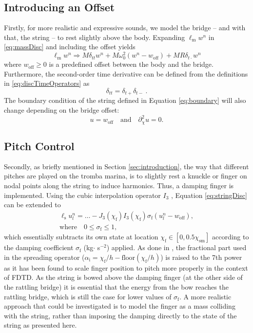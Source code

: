 \documentclass[dvipsnames, pdftex]{article}
\def\stringx{\chi}
\def\us{u}
\def\um{w}
\begin{document}
\subsection{Introducing an Offset}
Firstly, for more realistic and expressive sounds, we model the bridge -- and with that, the string -- to rest slightly above the body. Expanding $\ell_\text{m}\um^n$ in \eqref{eq:massDisc} and including the offset yields
\begin{equation}\label{eq:offset}
    \ell_\text{m}\um^n \Rightarrow M\delta_{tt}\um^n+M\omega_0^2(\um^n-\um_\text{off})+MR\delta_{t\cdot}\um^n
\end{equation}
where $\um_\text{off} \geq 0$ is a predefined offset between the body and the bridge. Furthermore, the second-order time derivative can be defined from the definitions in \eqref{eq:discTimeOperators} as
\begin{equation}
    \delta_{tt} = \delta_{t+}\delta_{t-}\ .
\end{equation}
The boundary condition of the string defined in Equation \eqref{eq:boundary} will also change depending on the bridge offset:
\begin{equation}\label{eq:newBoundary}
    \us = \um_\text{off}\quad \text{and} \quad \partial_\stringx^2\us=0.
\end{equation}

\subsection{Pitch Control}
Secondly, as briefly mentioned in Section \ref{sec:introduction}, the way that different pitches are played on the tromba marina, is to slightly rest a knuckle or finger on nodal points along the string to induce harmonics. Thus, a damping finger is implemented. Using the cubic interpolation operator $I_3$ \cite{bilbao2009numerical}, Equation \eqref{eq:stringDisc} can be extended to
\begin{gather}\label{eq:dampingFinger}
    \ell_\text{s} \us_l^n = \hdots - J_3(\stringx_\text{f})I_3(\stringx_\text{f})\sigma_\text{f}(\us^n_l-\um_\text{off}),\\
   \text{where} \quad 0\leq \sigma_\text{f} \leq 1,\nonumber
\end{gather}
which essentially subtracts its own state at location $\stringx_\text{f} \in [0,0.5\stringx_\text{sm}]$ according to the damping coefficient $\sigma_\text{f}$ (kg$ \cdot$ s$^{-2}$) applied. As done in \cite{Willemsen2019a:SMC2020}, the fractional part used in the spreading operator ($\alpha_\text{i} = \stringx_\text{f}/h - \text{floor}(\stringx_\text{f}/h)$) is raised to the 7th power as it has been found to scale finger position to pitch more properly in the context of FDTD. As the string is bowed above the damping finger (at the other side of the rattling bridge) it is essential that the energy from the bow reaches the rattling bridge, which is still the case for lower values of $\sigma_\text{f}$. A more realistic approach that could be investigated is to model the finger as a mass colliding with the string, rather than imposing the damping directly to the state of the string as presented here.
\end{document}
